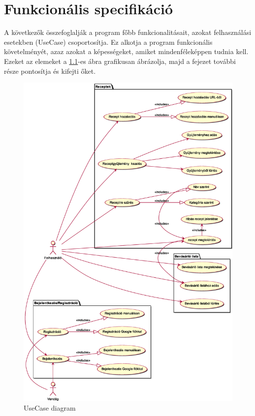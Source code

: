 \documentclass[12pt]{report}
\theoremstyle{definition}
\begin{document}
\chapter{Funkcionális specifikáció}
A következők összefoglalják a program főbb funkcionalitásait, azokat felhasználási esetekben (UseCase) csoportosítja. Ez alkotja a  program funkcionális követelményét, azaz azokat a képességeket, amiket mindenféleképpen tudnia kell. Ezeket az elemeket a \ref{fig:useCase}-es ábra grafikusan ábrázolja, majd a fejezet további része pontosítja és kifejti őket.

\noindent
\begin{figure}[h]
	\centering
	\includegraphics[width=\textwidth]{out/diagrams/useCase/use-case.eps}
	\caption{UseCase diagram}
    \label{fig:useCase}
\end{figure}
\end{document}
